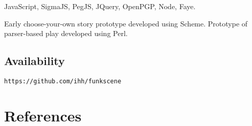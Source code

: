 \documentclass{acm_proc_article-sp}
\begin{document}
JavaScript, SigmaJS, PegJS, JQuery, OpenPGP, Node, Faye.

Early choose-your-own story prototype developed using Scheme.
Prototype of parser-based play developed using Perl.


\subsection{Availability}

{\tt https://github.com/ihh/funkscene}

\section{References}




\balancecolumns
\end{document}
